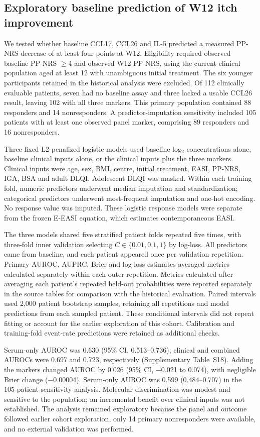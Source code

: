 \documentclass[10pt,a4paper]{article}
\begin{document}
\subsection{Exploratory baseline prediction of W12 itch improvement}
We tested whether baseline CCL17, CCL26 and IL-5 predicted a measured PP-NRS decrease of at least four points at W12. Eligibility required observed baseline PP-NRS $\geq$4 and observed W12 PP-NRS, using the current clinical population aged at least 12 with unambiguous initial treatment. The six younger participants retained in the historical analysis were excluded. Of 112 clinically evaluable patients, seven had no baseline assay and three lacked a usable CCL26 result, leaving 102 with all three markers. This primary population contained 88 responders and 14 nonresponders. A predictor-imputation sensitivity included 105 patients with at least one observed panel marker, comprising 89 responders and 16 nonresponders.

Three fixed L2-penalized logistic models used baseline log$_2$ concentrations alone, baseline clinical inputs alone, or the clinical inputs plus the three markers. Clinical inputs were age, sex, BMI, centre, initial treatment, EASI, PP-NRS, IGA, BSA and adult DLQI. Adolescent DLQI was masked. Within each training fold, numeric predictors underwent median imputation and standardization; categorical predictors underwent most-frequent imputation and one-hot encoding. No response value was imputed. These logistic response models were separate from the frozen E-EASI equation, which estimates contemporaneous EASI.

The three models shared five stratified patient folds repeated five times, with three-fold inner validation selecting $C\in\{0.01,0.1,1\}$ by log-loss. All predictors came from baseline, and each patient appeared once per validation repetition. Primary AUROC, AUPRC, Brier and log-loss estimates averaged metrics calculated separately within each outer repetition. Metrics calculated after averaging each patient's repeated held-out probabilities were reported separately in the source tables for comparison with the historical evaluation. Paired intervals used 2,000 patient bootstrap samples, retaining all repetitions and model predictions from each sampled patient. These conditional intervals did not repeat fitting or account for the earlier exploration of this cohort. Calibration and training-fold event-rate predictions were retained as additional checks.

Serum-only AUROC was 0.630 (95\% CI, 0.513--0.736); clinical and combined AUROCs were 0.697 and 0.723, respectively (Supplementary Table~S18). Adding the markers changed AUROC by 0.026 (95\% CI, $-$0.021 to 0.074), with negligible Brier change ($-$0.00004). Serum-only AUROC was 0.599 (0.484--0.707) in the 105-patient sensitivity analysis. Molecular discrimination was modest and sensitive to the population; an incremental benefit over clinical inputs was not established. The analysis remained exploratory because the panel and outcome followed earlier cohort exploration, only 14 primary nonresponders were available, and no external validation was performed.
\end{document}

